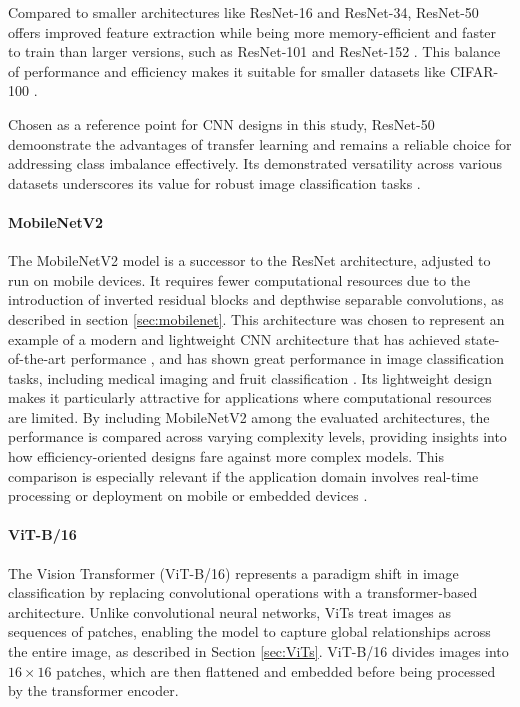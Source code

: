 Compared to smaller architectures like ResNet-16 and ResNet-34, ResNet-50 offers improved feature extraction while being more memory-efficient and faster to train than larger versions, such as ResNet-101 and ResNet-152 \cite{he2015deepresiduallearningimage}. This balance of performance and efficiency makes it suitable for smaller datasets like CIFAR-100 \cite{10083966}.

Chosen as a reference point for CNN designs in this study, ResNet-50 demoonstrate the advantages of transfer learning and remains a reliable choice for addressing class imbalance effectively. Its demonstrated versatility across various datasets underscores its value for robust image classification tasks \cite{he2015deepresiduallearningimage,yun2019cutmixregularizationstrategytrain,}.

\paragraph{MobileNetV2}
The MobileNetV2 model  is a successor to the ResNet architecture, adjusted to run on mobile devices. It requires fewer computational resources due to the introduction of inverted residual blocks and depthwise separable convolutions, as described in section \ref{sec:mobilenet}. This architecture was chosen to represent an example of a modern and lightweight CNN architecture that has achieved state-of-the-art performance \cite{sandler2018mobilenetv2}, and has shown great performance in image classification tasks, including medical imaging \cite{surya2024enhancedbreastcancertumor} and fruit classification \cite{10112802, shahi2022fruit}. Its lightweight design makes it particularly attractive for applications where computational resources are limited. By including MobileNetV2 among the evaluated architectures, the performance is compared across varying complexity levels, providing insights into how efficiency-oriented designs fare against more complex models. This comparison is especially relevant if the application domain involves real-time processing or deployment on mobile or embedded devices \cite{sandler2018mobilenetv2}. 


\paragraph{ViT-B/16}
The Vision Transformer (ViT-B/16) \cite{dosovitskiy2021imageworth16x16words} represents a paradigm shift in image classification by replacing convolutional operations with a transformer-based architecture. Unlike convolutional neural networks, ViTs treat images as sequences of patches, enabling the model to capture global relationships across the entire image, as described in Section \ref{sec:ViTs}. ViT-B/16 divides images into $16\times 16$ patches, which are then flattened and embedded before being processed by the transformer encoder.

